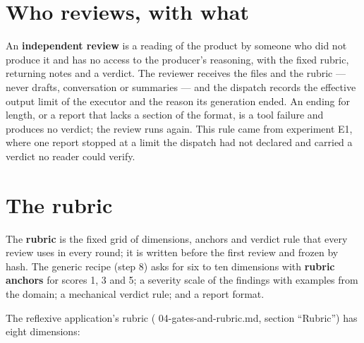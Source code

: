 \documentclass[
  american,
  10pt,
]{report}
\renewcommand{\texttt}[1]{{\ttfamily\hyphenchar\font=-1 #1}}
\begin{document}
\section{Who reviews, with what}\label{who-reviews-with-what}

An \textbf{independent review} is a reading of the product by someone
who did not produce it and has no access to the producer's reasoning,
with the fixed rubric, returning notes and a verdict. The reviewer
receives the files and the rubric --- never drafts, conversation or
summaries --- and the dispatch records the effective output limit of the
executor and the reason its generation ended. An ending for length, or a
report that lacks a section of the format, is a tool failure and
produces no verdict; the review runs again. This rule came from
experiment E1, where one report stopped at a limit the dispatch had not
declared and carried a verdict no reader could verify.

\section{The rubric}\label{the-rubric}

The \textbf{rubric} is the fixed grid of dimensions, anchors and verdict
rule that every review uses in every round; it is written before the
first review and frozen by hash. The generic recipe (step 8) asks for
six to ten dimensions with \textbf{rubric anchors} for scores 1, 3 and
5; a severity scale of the findings with examples from the domain; a
mechanical verdict rule; and a report format.

The reflexive application's rubric
(\texttt{04-\allowbreak{}gates-\allowbreak{}and-\allowbreak{}rubric.\allowbreak{}md},
section ``Rubric'') has eight dimensions:
\end{document}
